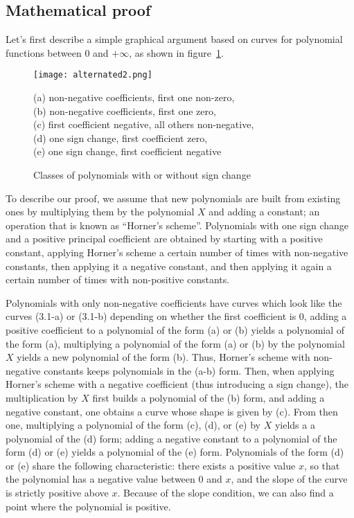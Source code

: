 \documentclass{article}
\begin{document}
\subsection{Mathematical proof}
Let's first describe a simple graphical argument based on curves for polynomial functions between 0 and \(+\infty\), as shown in figure~\ref{graph-desc}.
\begin{figure}
\label{graph-desc}
\begin{center}
\texttt{[image: alternated2.png]}
\end{center}
{(a) non-negative coefficients, first one non-zero,\\
(b) non-negative coefficients, first one zero,\\
(c) first coefficient negative, all others non-negative,\\
(d) one sign change, first coefficient zero,\\
(e) one sign change, first coefficient negative}

\caption{Classes of polynomials with or without
sign change}
\end{figure}
To describe our proof, we assume that new polynomials are built from
existing ones by multiplying them by the polynomial \(X\) and adding a
constant; an operation that is known as ``Horner's scheme''.
Polynomials with one sign change and a positive principal coefficient
are obtained by starting with a positive constant, applying Horner's
scheme a certain number of times with non-negative constants, then
applying it a negative constant, and then applying it again a certain
number of times with non-positive constants.

Polynomials with only non-negative coefficients have curves which look
like the curves (3.1-a) or (3.1-b) depending on whether the first
coefficient is 0, adding a positive coefficient to a polynomial of the
form (a) or (b) yields a polynomial of the form (a), multiplying a
polynomial of the form (a) or (b) by the polynomial \(X\) yields a new
polynomial of the form (b).  Thus, Horner's scheme with non-negative
constants keeps polynomials in the (a-b) form.  Then, when applying
Horner's scheme with a negative coefficient (thus introducing a sign
change), the multiplication by \(X\) first builds a polynomial of the
(b) form, and adding a negative constant, one obtains a curve whose
shape is given by (c).  From then one, multiplying a polynomial of the
form (c), (d), or (e) by \(X\) yields a a polynomial of the (d) form; adding a
negative constant to a polynomial of the form (d) or (e) yields a
polynomial of the (e) form.  Polynomials of the form (d) or (e)
share the following characteristic: there exists a positive value
\(x\), so that the polynomial has a negative value between 0 and
\(x\), and the slope of the curve is strictly positive above
\(x\).  Because of the slope condition, we can also find a point where
the polynomial is positive.
\end{document}

